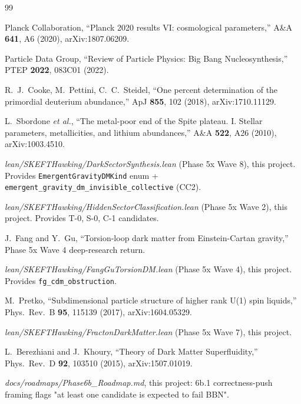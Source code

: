 \documentclass[twocolumn]{revtex4-2}
\begin{document}
\begin{thebibliography}{99}

Planck Collaboration,
``Planck 2020 results VI: cosmological parameters,''
A\&A \textbf{641}, A6 (2020), arXiv:1807.06209.

Particle Data Group, ``Review of Particle Physics: Big Bang Nucleosynthesis,''
PTEP \textbf{2022}, 083C01 (2022).

R.~J.~Cooke, M.~Pettini, C.~C.~Steidel,
``One percent determination of the primordial deuterium abundance,''
ApJ \textbf{855}, 102 (2018), arXiv:1710.11129.

L.~Sbordone \emph{et al.},
``The metal-poor end of the Spite plateau. I. Stellar parameters,
metallicities, and lithium abundances,''
A\&A \textbf{522}, A26 (2010), arXiv:1003.4510.

\emph{lean/SKEFTHawking/DarkSectorSynthesis.lean} (Phase 5x Wave 8),
this project. Provides
\texttt{EmergentGravityDMKind} enum +
\texttt{emergent\_gravity\_dm\_invisible\_collective} (CC2).

\emph{lean/SKEFTHawking/HiddenSectorClassification.lean} (Phase 5x Wave 2),
this project. Provides T-0, S-0, C-1 candidates.

J.~Fang and Y.~Gu, ``Torsion-loop dark matter from
Einstein-Cartan gravity,'' Phase 5x Wave 4 deep-research return.

\emph{lean/SKEFTHawking/FangGuTorsionDM.lean} (Phase 5x Wave 4),
this project. Provides \texttt{fg\_cdm\_obstruction}.

M.~Pretko,
``Subdimensional particle structure of higher rank U(1) spin liquids,''
Phys.\ Rev.\ B \textbf{95}, 115139 (2017), arXiv:1604.05329.

\emph{lean/SKEFTHawking/FractonDarkMatter.lean} (Phase 5x Wave 7),
this project.

L.~Berezhiani and J.~Khoury,
``Theory of Dark Matter Superfluidity,''
Phys.\ Rev.\ D \textbf{92}, 103510 (2015), arXiv:1507.01019.

\emph{docs/roadmaps/Phase6b\_Roadmap.md}, this project: 6b.1
correctness-push framing flags "at least one candidate is expected
to fail BBN".

\end{thebibliography}
\end{document}
